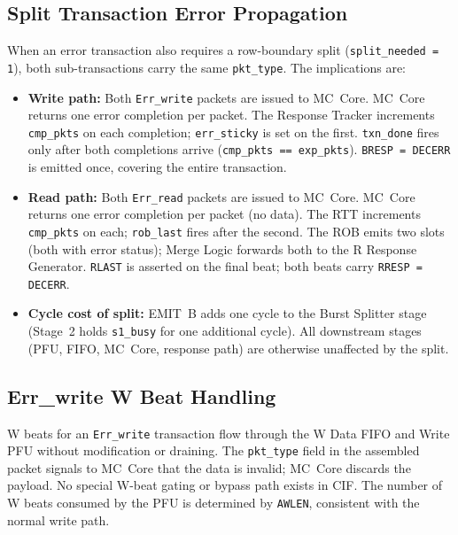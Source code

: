 \documentclass[11pt,a4paper]{article}
\begin{document}
\subsection{Split Transaction Error Propagation}

When an error transaction also requires a row-boundary split
(\texttt{split\_needed = 1}), both sub-transactions carry the same
\texttt{pkt\_type}. The implications are:

\begin{itemize}
  \item \textbf{Write path:} Both \texttt{Err\_write} packets are issued to
        MC~Core. MC~Core returns one error completion per packet. The Response
        Tracker increments \texttt{cmp\_pkts} on each completion; \texttt{err\_sticky}
        is set on the first. \texttt{txn\_done} fires only after both
        completions arrive (\texttt{cmp\_pkts == exp\_pkts}).
        \texttt{BRESP = DECERR} is emitted once, covering the entire
        transaction.
  \item \textbf{Read path:} Both \texttt{Err\_read} packets are issued to
        MC~Core. MC~Core returns one error completion per packet (no data).
        The RTT increments \texttt{cmp\_pkts} on each; \texttt{rob\_last}
        fires after the second. The ROB emits two slots (both with error
        status); Merge Logic forwards both to the R Response Generator.
        \texttt{RLAST} is asserted on the final beat; both beats carry
        \texttt{RRESP = DECERR}.
  \item \textbf{Cycle cost of split:} EMIT~B adds one cycle to the Burst
        Splitter stage (Stage~2 holds \texttt{s1\_busy} for one additional
        cycle). All downstream stages (PFU, FIFO, MC~Core, response path) are
        otherwise unaffected by the split.
\end{itemize}

\subsection{Err\_write W Beat Handling}

W beats for an \texttt{Err\_write} transaction flow through the W Data FIFO
and Write PFU without modification or draining. The \texttt{pkt\_type} field in
the assembled packet signals to MC~Core that the data is invalid; MC~Core
discards the payload. No special W-beat gating or bypass path exists in CIF.
The number of W beats consumed by the PFU is determined by \texttt{AWLEN},
consistent with the normal write path.
\end{document}
